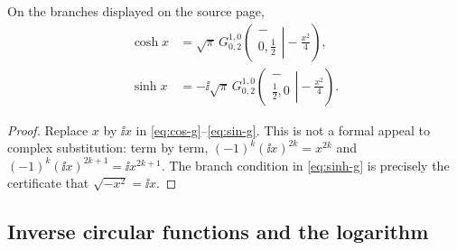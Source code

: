 \begin{corollary}\label{cor:hyperbolic-g}
On the branches displayed on the source page,
\begin{align}
 \cosh x&=\sqrt\pi\,G_{0,2}^{1,0}\!\left(
  \left.\begin{matrix}-\\0,\frac12\end{matrix}\right|-\frac{x^2}{4}\right),
 \label{eq:cosh-g}\\
 \sinh x&=-\ii\sqrt\pi\,G_{0,2}^{1,0}\!\left(
  \left.\begin{matrix}-\\\frac12,0\end{matrix}\right|-\frac{x^2}{4}\right).
 \label{eq:sinh-g}
\end{align}
\end{corollary}
\begin{proof}
Replace $x$ by $\ii x$ in \eqref{eq:cos-g}--\eqref{eq:sin-g}.  This is not a
formal appeal to complex substitution: term by term, $(-1)^k(\ii x)^{2k}=x^{2k}$
and $(-1)^k(\ii x)^{2k+1}=\ii x^{2k+1}$.  The branch condition in
\eqref{eq:sinh-g} is precisely the certificate that
$\sqrt{-x^2}=\ii x$.
\end{proof}

\subsection{Inverse circular functions and the logarithm}

